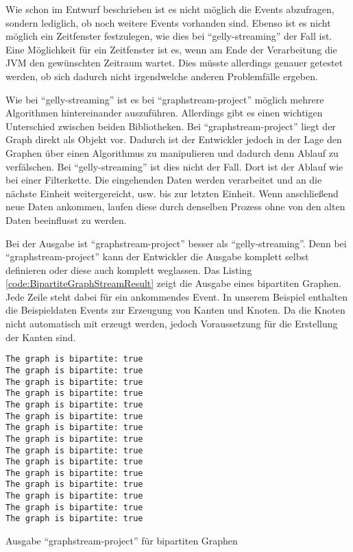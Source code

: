 Wie schon im Entwurf beschrieben ist es nicht möglich die Events abzufragen,
sondern lediglich, ob noch weitere Events vorhanden sind. Ebenso ist es nicht
möglich ein Zeitfenster festzulegen, wie dies bei \enquote{gelly-streaming}
der Fall ist. Eine Möglichkeit für ein Zeitfenster ist es, wenn am Ende der
Verarbeitung die \gls{JVM} den gewünschten Zeitraum wartet. Dies müsste
allerdings genauer getestet werden, ob sich dadurch nicht irgendwelche anderen
Problemfälle ergeben.

Wie bei \enquote{gelly-streaming} ist es bei \enquote{graphstream-project}
möglich mehrere Algorithmen hintereinander auszuführen. Allerdings gibt es einen
wichtigen Unterschied zwischen beiden Bibliotheken. Bei \enquote{graphstream-project}
liegt der Graph direkt als Objekt vor. Dadurch ist der Entwickler jedoch in
der Lage den Graphen über einen Algorithmus zu manipulieren und dadurch denn
Ablauf zu verfälschen. Bei \enquote{gelly-streaming} ist dies nicht der Fall.
Dort ist der Ablauf wie bei einer Filterkette. Die eingehenden Daten werden
verarbeitet und an die nächste Einheit weitergereicht, usw. bis zur letzten
Einheit. Wenn anschließend neue Daten ankommen, laufen diese durch denselben
Prozess ohne von den alten Daten beeinflusst zu werden.

Bei der Ausgabe ist \enquote{graphstream-project} besser als
\enquote{gelly-streaming}. Denn bei \enquote{graphstream-project} kann der
Entwickler die Ausgabe komplett selbst definieren oder diese auch komplett
weglassen. Das Listing \ref{code:BipartiteGraphStreamResult} zeigt die Ausgabe
eines bipartiten Graphen. Jede Zeile steht dabei für ein ankommendes Event. In
unserem Beispiel enthalten die Beispieldaten Events zur Erzeugung von Kanten und
Knoten. Da die Knoten nicht automatisch mit erzeugt werden, jedoch Voraussetzung
für die Erstellung der Kanten sind.

\begin{listing}
\begin{verbatim}
The graph is bipartite: true
The graph is bipartite: true
The graph is bipartite: true
The graph is bipartite: true
The graph is bipartite: true
The graph is bipartite: true
The graph is bipartite: true
The graph is bipartite: true
The graph is bipartite: true
The graph is bipartite: true
The graph is bipartite: true
The graph is bipartite: true
The graph is bipartite: true
The graph is bipartite: true
The graph is bipartite: true
\end{verbatim}
\caption{Ausgabe \enquote{graphstream-project} für bipartiten Graphen}
\label{code:BipartiteGraphStreamResult}
\end{listing}

